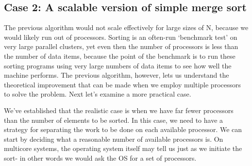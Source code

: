 \documentclass[letterpaper,10pt,openany,oneside]{sphinxmanual}
\begin{document}
\subsection{Case 2: A scalable version of simple merge sort}
\label{MergeSort/MergeSort:case-2-a-scalable-version-of-simple-merge-sort}
The previous algorithm would not scale effectively for large sizes of N, because we would likely run out of processors.  Sorting is an often-run ‘benchmark test’ on very large parallel clusters, yet even then the number of processors is less than the number of data items, because the point of the benchmark is to run these sorting programs using very large numbers of data items to see how well the machine performs.  The previous algorithm, however, lets us understand the theoretical improvement that can be made when we employ multiple processors to solve the problem. Next let’s examine a more practical case.

We've established that the realistic case is when we have far fewer processors than the number of elements to be sorted. In this case, we need to have a strategy for separating the work to be done on each available processor.  We can start by deciding what a reasonable number of available processors is.  On multicore systems, the operating system itself may tell us just as we initiate the sort- in other words we would ask the OS for a set of processors.
\end{document}
